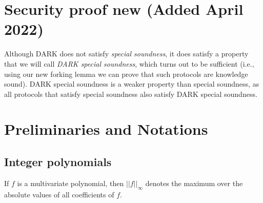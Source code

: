 \clearpage
\section*{\scalebox{1.25}{\appendixphrase}}
\section{Security proof new (Added April 2022)}


Although DARK does not satisfy \emph{special soundness}, it does satisfy a property that we will call \emph{DARK special soundness}, which turns out to be sufficient (i.e., using our new forking lemma we can prove that such protocols are knowledge sound). DARK special soundness is a weaker property than special soundness, as all protocols that satisfy special soundness also satisfy DARK special soundness. 

\section{Preliminaries and Notations}

\subsection{Integer polynomials} If $f$ is a multivariate polynomial, then $||f||_\infty$ denotes the maximum over the absolute values of all coefficients of $f$. 

